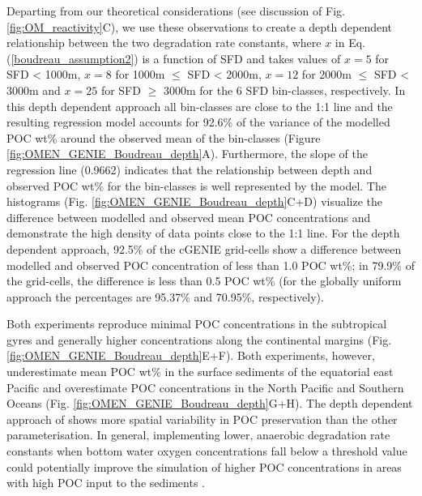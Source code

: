 \documentclass[gmd, manuscript]{copernicus}
\begin{document}
Departing from our theoretical considerations (see discussion of Fig. \ref{fig:OM_reactivity}C), we use these observations to create a depth dependent relationship between the two degradation rate constants, where $x$ in Eq. (\ref{boudreau_assumption2}) is a function of SFD and takes values of $x=5$ for SFD < 1000m, $x=8$ for 1000m $\leq$ SFD < 2000m, 
$x=12$ for 2000m $\leq$ SFD < 3000m and $x=25$ for SFD $\geq$ 3000m for the 6 SFD bin-classes, respectively. 
In this depth dependent approach all bin-classes are close to the 1:1 line and the resulting regression model accounts for 92.6\% of the variance of the modelled POC wt\% around the observed mean of the bin-classes (Figure \ref{fig:OMEN_GENIE_Boudreau_depth}A). 
Furthermore, the slope of the regression line (0.9662) indicates that the relationship between depth and observed POC wt\% for the bin-classes is well represented by the model. 
The histograms (Fig. \ref{fig:OMEN_GENIE_Boudreau_depth}C+D) visualize the difference between modelled and observed mean POC concentrations and demonstrate the high density of data points close to the 1:1 line. 
For the depth dependent approach, 92.5\% of the cGENIE grid-cells show a difference between modelled and observed POC concentration of less than 1.0 POC wt\%; in 79.9\% of the grid-cells, the difference is less than 0.5 POC wt\% 
(for the globally uniform approach the percentages are 95.37\% and 70.95\%, respectively). 

Both experiments reproduce minimal POC concentrations in the subtropical gyres and generally higher concentrations along the continental margins (Fig. \ref{fig:OMEN_GENIE_Boudreau_depth}E+F). 
Both experiments, however, underestimate mean POC wt\% in the surface sediments of the equatorial east Pacific and overestimate POC concentrations 
in the North Pacific and Southern Oceans (Fig. \ref{fig:OMEN_GENIE_Boudreau_depth}G+H). 
The depth dependent approach of \citet{boudreau1997diagenetic} shows more spatial variability in POC preservation than the other parameterisation. 
In general, implementing lower, anaerobic degradation rate constants when bottom water oxygen concentrations fall below a threshold value could potentially improve the simulation of higher POC concentrations in areas with high POC input to the 
sediments \citep{palastanga_long_term_2011}. 

\end{document}
